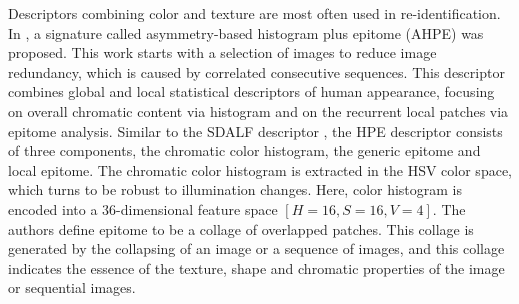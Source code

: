 Descriptors combining color and texture are most often used in re-identification. In \cite{AHPE}, a signature called asymmetry-based histogram plus epitome (AHPE) was proposed. This work starts with a selection of images to reduce image redundancy, which is caused by correlated consecutive sequences. This descriptor combines global and local statistical descriptors of human appearance, focusing on overall chromatic content via histogram and on the recurrent local patches via epitome analysis. Similar to the SDALF descriptor \cite{SDALF}, the HPE descriptor consists of three components, the chromatic color histogram, the generic epitome and local epitome. The chromatic color histogram is extracted in the HSV color space, which turns to be robust to illumination changes. Here, color histogram is encoded into a 36-dimensional feature space $[H=16,  S=16,  V=4]$. The authors define epitome to be a collage of overlapped patches. This collage is generated by the collapsing of an image or a sequence of images, and this collage indicates the essence of the texture, shape and chromatic properties of the image or sequential images.

